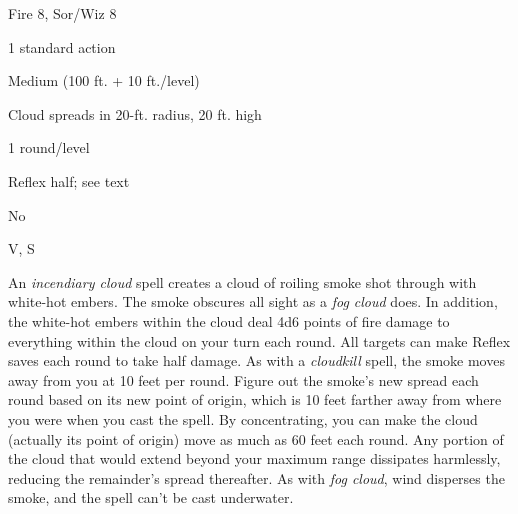 
\begin{description*}
\item[Level:] Fire 8, Sor/Wiz 8
\item[Casting Time:] 1 standard action
\item[Range:] Medium (100 ft. + 10 ft./level)
\item[Effect:] Cloud spreads in 20-ft. radius, 20 ft. high
\item[Duration:] 1 round/level
\item[Saving Throw:] Reflex half; see text
\item[Spell Resistance:] No
\item[Components:] V, S
\end{description*}

An \textit{incendiary cloud} spell creates a cloud of roiling smoke shot through
with white-hot embers. The smoke obscures all sight as a \textit{fog cloud} does.
In addition, the white-hot embers within the cloud deal 4d6 points of fire damage
to everything within the cloud on your turn each round. All targets can make Reflex
saves each round to take half damage.
As with a \textit{cloudkill} spell, the smoke moves away from you at 10 feet per
round. Figure out the smoke's new spread each round based on its new point of origin,
which is 10 feet farther away from where you were when you cast the spell. By concentrating,
you can make the cloud (actually its point of origin) move as much as 60 feet each
round. Any portion of the cloud that would extend beyond your maximum range dissipates
harmlessly, reducing the remainder's spread thereafter.
As with \textit{fog cloud}, wind disperses the smoke, and the spell can't be cast
underwater.